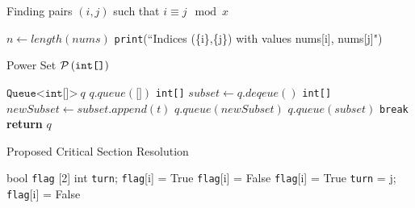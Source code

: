 \documentclass[10pt, oneside]{article}
\begin{document}
\begin{algorithm}
\caption{Finding pairs $(i,j)$ such that $i \equiv j \mod x$}
    \begin{algorithmic}
        \State $n \gets length(nums)$
                    \State\texttt{print}(``Indices (\{i\},\{j\}) with values nums[i], nums[j]")
                \EndIf
            \EndFor
        \EndFor
    \EndFunction
    \end{algorithmic}
\end{algorithm}

\begin{algorithm}
\caption{Power Set $\mathcal{P}\left( \texttt{int[]} \right)$}
    \begin{algorithmic}[0]
        \State $\texttt{Queue<int[]>} \ q$							
        \State $q.queue(\texttt{[]})$								
         						
             								
                \State \texttt{int[]} $subset \gets q.deqeue()$
                \State \texttt{int[]} $newSubset \gets subset.append(t)$ 
                \Statex
                \State $q.queue(newSubset)$							
                \State $q.queue(subset)$							
                    \State \texttt{break}							
                \EndIf
            \EndWhile
        \EndFor
        \State \textbf{return} $q$
    \EndFunction
    \end{algorithmic}
\end{algorithm}

\begin{algorithm}
    \caption{Proposed Critical Section Resolution}
    \begin{algorithmic}
        \State bool \texttt{flag} [2]  
        \State int \texttt{turn}; 
        \DoWhile
            \State \texttt{flag}[i] = True  
                    \State \texttt{flag}[i] = False
                     
                    \EndWhile
                    \State \texttt{flag}[i] = True
                \EndIf
            \EndWhile
            \State \texttt{turn} = j;
            \State \texttt{flag}[i] = False
    \end{algorithmic}
\end{algorithm}
\end{document}
